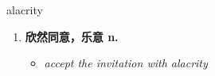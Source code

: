 
\begin{frame}
{\huge alacrity}
\begin{center}
\begin{enumerate}\Large
  \item \textbf{欣然同意，乐意 n.}
  \begin{itemize}
    \item \em{\Large{accept the invitation with alacrity}}
  \end{itemize}
\end{enumerate}
\end{center}
\end{frame}
